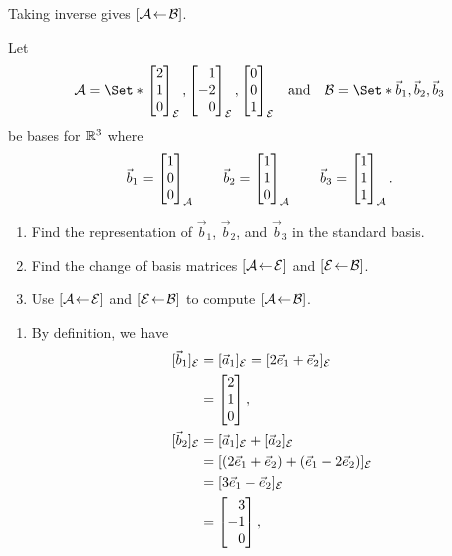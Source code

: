 \begin{exercises}
\begin{problist}
\begin{solution}
\begin{enumerate}
				Taking inverse gives $\BasisChange{\mathcal B}{\mathcal A}$.
			\end{enumerate}
		\end{solution}
		\prob 
		Let
		\[
			\mathcal A=\Set*{
				\mat{2\\1\\0}_{\mathcal E},
				\mat{1\\-2\\0}_{\mathcal E},
				\mat{0\\0\\1}_{\mathcal E}
			}\quad\text{and}\quad
			\mathcal B=\Set*{\vec b_1,\vec b_2,\vec b_3
			}
		\]
		be bases for $\R^3$ where
		\[
			\vec b_1=\mat{1\\0\\0}_{\mathcal A}
			\qquad
			\vec b_2=\mat{1\\1\\0}_{\mathcal A}
			\qquad
			\vec b_3=\mat{1\\1\\1}_{\mathcal A}.
		\]
		\begin{enumerate}
			\item Find the representation of $\vec b_1$, $\vec b_2$, and $\vec b_3$
				in the standard basis.
			\item Find the change of basis matrices $\BasisChange{\mathcal E}{\mathcal A}$
				and $\BasisChange{\mathcal B}{\mathcal E}$.
			\item Use $\BasisChange{\mathcal E}{\mathcal A}$
				and $\BasisChange{\mathcal B}{\mathcal E}$ to compute
				$\BasisChange{\mathcal B}{\mathcal A}$.
		\end{enumerate}
		\begin{solution}
			\begin{enumerate}
				\item By definition, we have
				\[
					\begin{aligned}
						[\vec b_1]_{\mathcal E}&=[\vec a_1]_{\mathcal E}=[2\vec e_1+\vec e_2]_{\mathcal E} \\&= \mat{2\\1\\0},\\
						[\vec b_2]_{\mathcal E}&=[\vec a_1]_{\mathcal E}+[\vec a_2]_{\mathcal E}\\
						&=[(2\vec e_1+\vec e_2)+(\vec e_1-2\vec e_2)]_{\mathcal E}\\
						&=[3\vec e_1-\vec e_2]_{\mathcal E}
						\\&=\mat{3\\-1\\0},\\

\end{aligned}\]
\end{enumerate}
\end{solution}
\end{problist}
\end{exercises}

